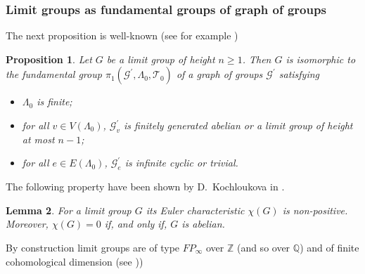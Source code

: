 \documentclass[10pt]{amsart}
\theoremstyle{plain}
\newtheorem{prop}{Proposition}
\newtheorem{Lemma}[prop]{Lemma}
\theoremstyle{definition}
\theoremstyle{remark}
\numberwithin{prop}{section}
\numberwithin{example}{section}
\numberwithin{equation}{section}
\newcommand{\Z}{\mathbb{Z}}
\newcommand{\Q}{\mathbb{Q}}
\newcommand{\caT}{\mathcal{T}}
\newcommand{\gG}{\mathcal{G}}
\begin{document}
	\subsubsection{Limit groups as fundamental groups of graph of groups} The next proposition is well-known 
	(see for example \cite[Proposition~2.1]{jh})
	\begin{prop}
		\label{prop:prin}
		Let $G$ be a limit group of height $n\geq 1$. Then $G$ is isomorphic to the fundamental
		group $\pi_1(\gG^\prime,\Lambda_0,\caT_0)$ of a graph of groups $\gG^\prime$
		satisfying
		\begin{itemize}
			\item[(i)] $\Lambda_0$ is finite;
			\item[(ii)] for all $v\in V(\Lambda_0)$, $\gG^\prime_v$ is finitely generated abelian
			or a limit group of height at most $n-1$;
			\item[(iii)] for all $e\in E(\Lambda_0)$, $\gG^\prime_e$ is infinite cyclic or trivial.
		\end{itemize}
	\end{prop}
	
	
	
	
	
	The following property have  been shown by
	D.~Kochloukova in \cite{D}. 
	
	\begin{Lemma}
		\label{l4}
		For a limit group $G$ its Euler characteristic $\chi(G)$ is non-positive. Moreover, 
		$\chi(G)=0$ if, and only if,  $G$ is abelian. 
	\end{Lemma}
	By construction limit groups are of type $FP_{\infty}$ over $\Z$  (and so over $\Q$) and of
	finite cohomological dimension (see \cite[ Cor.~8]{D}))
\end{document}
